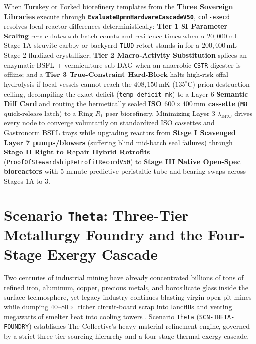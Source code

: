 When Turnkey or Forked biorefinery templates from the \textbf{Three Sovereign Libraries} execute through \textbf{\texttt{EvaluateBpmnHardwareCascadeV50}},
\texttt{col-execd} resolves local reactor differences deterministically: \textbf{Tier 1 SI Parameter Scaling} recalculates sub-batch counts and
residence times when a $20{,}000\,\mathrm{mL}$ Stage 1A struvite carboy or backyard \texttt{TLUD} retort stands in for a $200{,}000\,\mathrm{mL}$
Stage 2 fluidized crystallizer; \textbf{Tier 2 Macro-Activity Substitution} splices an enzymatic BSFL + vermiculture sub-DAG when an anaerobic
\texttt{CSTR} digester is offline; and a \textbf{Tier 3 True-Constraint Hard-Block} halts high-risk offal hydrolysis if local vessels cannot reach
the $408{,}150\,\mathrm{mK}$ ($135^\circ\mathrm{C}$) prion-destruction ceiling, decompiling the exact deficit (\texttt{temp\_deficit\_mk}) to a Layer 6
\textbf{Semantic Diff Card} and routing the hermetically sealed \textbf{ISO $600\times 400\,\mathrm{mm}$ cassette} (\texttt{M8} quick-release latch) to a
Ring $R_1$ peer biorefinery. Minimizing Layer 3 $\lambda_{\mathrm{ERC}}$ drives every node to converge voluntarily on standardized ISO cassettes and
Gastronorm BSFL trays while upgrading reactors from \textbf{Stage I Scavenged Layer 7 pumps/blowers} (suffering blind mid-batch seal failures) through
\textbf{Stage II Right-to-Repair Hybrid Retrofits} (\texttt{ProofOfStewardshipRetrofitRecordV50}) to \textbf{Stage III Native Open-Spec bioreactors}
with 5-minute predictive peristaltic tube and bearing swaps across Stages 1A to 3.

\section{Scenario \texttt{Theta}: Three-Tier Metallurgy Foundry and the Four-Stage Exergy Cascade}
\label{sec:scn-theta}

Two centuries of industrial mining have already concentrated billions of tons of refined iron, aluminum, copper, precious metals, and
borosilicate glass inside the surface technosphere, yet legacy industry continues blasting virgin open-pit mines while dumping
$40\text{--}80\times$ richer circuit-board scrap into landfills and venting megawatts of smelter heat into cooling towers
\parencite{georgescu1971,odum1971}. Scenario \texttt{Theta} (\texttt{SCN-THETA-FOUNDRY}) establishes The Collective's heavy material refinement
engine, governed by a strict three-tier sourcing hierarchy and a four-stage thermal exergy cascade.

